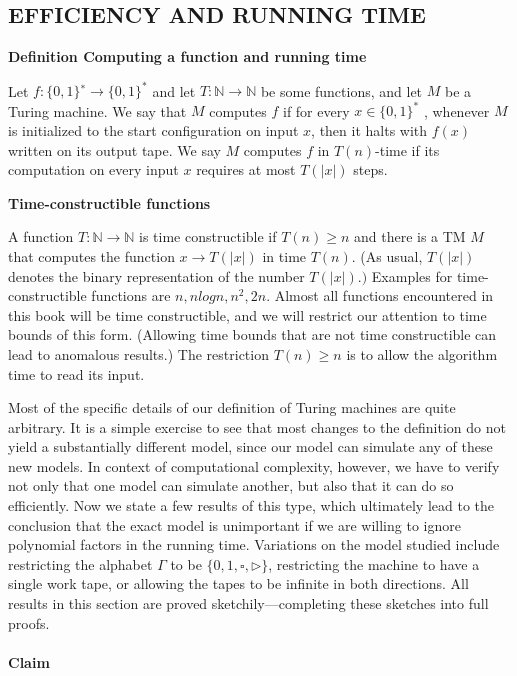 \documentclass[a4paper,12pt]{article}
\begin{document}
\subsection{EFFICIENCY AND RUNNING TIME}

\textbf{Definition Computing a function and running time}

Let $f : \{0, 1\}^{∗} \rightarrow \{0, 1\}^{*}$ and let $T :  \mathbb{N} →  \mathbb{N}$ be some functions, and let $M$ be a Turing
machine. We say that $M$ computes $f$ if for every $x \in \{0, 1\}^{*}$ , whenever $M$ is initialized
to the start configuration on input $x$, then it halts with $f(x)$ written on its output tape.
We say $M$ computes $f$ in $T(n)$-time if its computation on every input $x$ requires at most $T(|x|)$ steps.

\textbf{Time-constructible functions}

A function $T : \mathbb{N} \rightarrow \mathbb{N}$ is time constructible if $T(n) \geq n$ and there is a TM $M$ that
computes the function $x  \rightarrow  T(|x|)$  in time $T(n)$. (As usual,  $T(|x|)$  denotes the binary
representation of the number $T(|x|).)$ Examples for time-constructible functions are $n, nlogn, n^2 , 2n $. Almost all functions encountered in this book will be time constructible,
and we will restrict our attention to time bounds of this form. (Allowing time bounds
that are not time constructible can lead to anomalous results.) The restriction $T(n) \geq n$
is to allow the algorithm time to read its input.

Most of the specific details of our definition of Turing machines are quite arbitrary. It is
a simple exercise to see that most changes to the definition do not yield a substantially
different model, since our model can simulate any of these new models. In context of
computational complexity, however, we have to verify not only that one model can
simulate another, but also that it can do so efficiently. Now we state a few results of this
type, which ultimately lead to the conclusion that the exact model is unimportant if we
are willing to ignore polynomial factors in the running time. Variations on the model
studied include restricting the alphabet $\Gamma$ to be $\{0, 1, \square, \rhd \}$, restricting the machine to
have a single work tape, or allowing the tapes to be infinite in both directions. All results
in this section are proved sketchily—completing these sketches into full proofs.

\paragraph{Claim}
\end{document}
